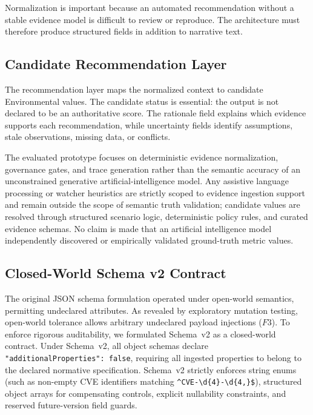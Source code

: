 \documentclass[conference]{IEEEtran}
\begin{document}
Normalization is important because an automated recommendation without a stable
evidence model is difficult to review or reproduce. The architecture must therefore
produce structured fields in addition to narrative text.

\subsection{Candidate Recommendation Layer}

The recommendation layer maps the normalized context to candidate
Environmental values. The candidate status is essential: the output is not
declared to be an authoritative score. The rationale field explains which
evidence supports each recommendation, while uncertainty fields identify
assumptions, stale observations, missing data, or conflicts.

The evaluated prototype focuses on deterministic evidence normalization, governance gates, and trace generation rather than the semantic accuracy of an unconstrained generative artificial-intelligence model. Any assistive language processing or watcher heuristics are strictly scoped to evidence ingestion support and remain outside the scope of semantic truth validation; candidate values are resolved through structured scenario logic, deterministic policy rules, and curated evidence schemas. No claim is made that an artificial intelligence model independently discovered or empirically validated ground-truth metric values.

\subsection{Closed-World Schema v2 Contract}
\label{sec:schema_v2_contract}
The original JSON schema formulation operated under open-world semantics, permitting undeclared attributes. As revealed by exploratory mutation testing, open-world tolerance allows arbitrary undeclared payload injections ($F3$). To enforce rigorous auditability, we formulated Schema~v2 as a closed-world contract. Under Schema~v2, all object schemas declare \texttt{"additionalProperties": false}, requiring all ingested properties to belong to the declared normative specification. Schema~v2 strictly enforces string enums (such as non-empty CVE identifiers matching \texttt{\textasciicircum CVE-\textbackslash d\{4\}-\textbackslash d\{4,\}\$}), structured object arrays for compensating controls, explicit nullability constraints, and reserved future-version field guards.
\end{document}
